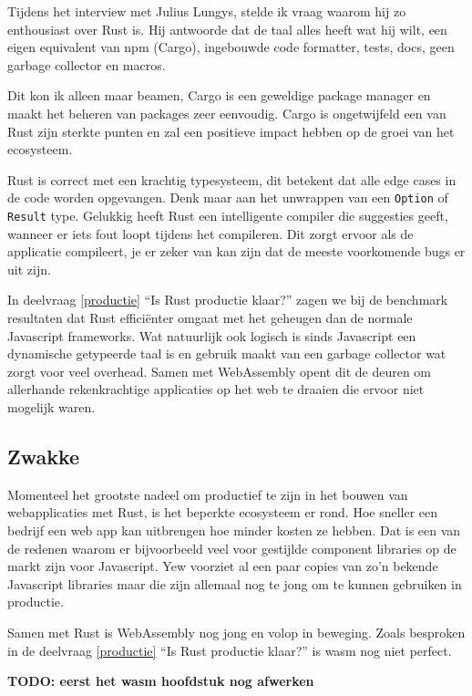 Tijdens het interview met Julius Lungys, stelde ik vraag waarom hij zo enthousiast over Rust is. 
Hij antwoorde dat de taal alles heeft wat hij wilt, een eigen equivalent van npm (Cargo), ingebouwde
code formatter, tests, docs, geen garbage collector en macros.

Dit kon ik alleen maar beamen, Cargo is een geweldige package manager en maakt het beheren van
packages zeer eenvoudig. Cargo is ongetwijfeld een van Rust zijn sterkte punten en zal een positieve
impact hebben op de groei van het ecosysteem.

Rust is correct met een krachtig typesysteem, dit betekent dat alle edge cases in de code worden
opgevangen. Denk maar aan het unwrappen van een \texttt{Option} of
\texttt{Result} type. Gelukkig heeft Rust een intelligente compiler die suggesties geeft,
wanneer er iets fout loopt tijdens het compileren. Dit zorgt ervoor als de applicatie compileert, je
er zeker van kan zijn dat de meeste voorkomende bugs er uit zijn.

In deelvraag \ref{productie} \enquote{Is Rust productie klaar?} zagen we bij de benchmark resultaten dat
Rust efficiënter omgaat met het geheugen dan de normale Javascript frameworks. Wat natuurlijk ook
logisch is sinds Javascript een dynamische getypeerde taal is en gebruik maakt van een garbage
collector wat zorgt voor veel overhead. Samen met WebAssembly opent dit de deuren om allerhande
rekenkrachtige applicaties op het web te draaien die ervoor niet mogelijk waren.

\subsection{Zwakke}

Momenteel het grootste nadeel om productief te zijn in het bouwen van webapplicaties met Rust, is
het beperkte ecosysteem er rond. Hoe sneller een bedrijf een web app kan uitbrengen hoe minder
kosten ze hebben. Dat is een van de redenen waarom er bijvoorbeeld veel voor gestijlde component
libraries op de markt zijn voor Javascript. Yew voorziet al een paar copies van zo'n bekende
Javascript libraries maar die zijn allemaal nog te jong om te kunnen gebruiken in productie.

Samen met Rust is WebAssembly nog jong en volop in beweging. Zoals besproken in de deelvraag
\ref{productie} \enquote{Is Rust productie klaar?} is wasm nog niet perfect.

\textbf{TODO: eerst het wasm hoofdstuk nog afwerken}

